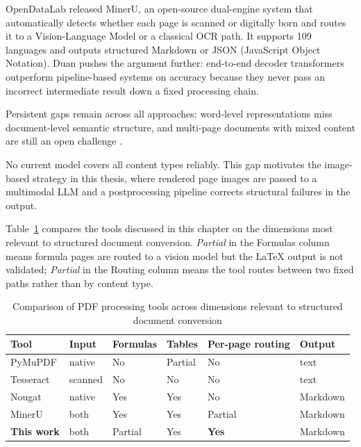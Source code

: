 OpenDataLab \autocite{mineru_software} released MinerU, an open-source dual-engine
system that automatically detects whether each page is scanned or digitally born
and routes it to a Vision-Language Model or a classical OCR path. It supports
109 languages and outputs structured Markdown or JSON (JavaScript Object Notation). Duan \autocite{duan2025}
pushes the argument further:
end-to-end decoder transformers outperform pipeline-based systems on accuracy
because they never pass an incorrect intermediate result down a fixed processing
chain.

Persistent gaps remain across all approaches: word-level representations miss
document-level semantic structure, and multi-page documents with mixed content
are still an open challenge \autocite{ding2026}.

No current model covers all content types reliably. This gap motivates the
image-based strategy in this thesis, where rendered page images are passed to a
multimodal LLM and a postprocessing pipeline corrects structural failures in the
output.

Table~\ref{tab:tool_comparison} compares the tools discussed in this chapter
on the dimensions most relevant to structured document conversion.
\textit{Partial} in the Formulas column means formula pages are routed to a
vision model but the LaTeX output is not validated; \textit{Partial} in the
Routing column means the tool routes between two fixed paths rather than by
content type.

\begin{table}[ht]
\centering
\caption{Comparison of PDF processing tools across dimensions relevant to
structured document conversion}
\label{tab:tool_comparison}
\small\setlength{\tabcolsep}{4pt}
\renewcommand{\arraystretch}{1.3}
\begin{tabularx}{\textwidth}{lXXXXX}
\toprule
\textbf{Tool} & \textbf{Input} & \textbf{Formulas} & \textbf{Tables} & \textbf{Per-page routing} & \textbf{Output} \\
\midrule
PyMuPDF    & native  & No      & Partial & No              & text     \\
Tesseract  & scanned & No      & No      & No              & text     \\
Nougat     & native  & Yes     & Yes     & No              & Markdown \\
MinerU     & both    & Yes     & Yes     & Partial         & Markdown \\
\textbf{This work} & both   & Partial & Yes & \textbf{Yes} & Markdown \\
\bottomrule
\end{tabularx}
\end{table}

